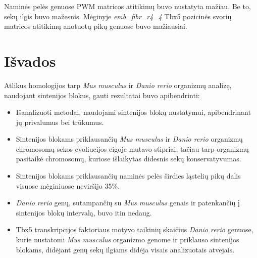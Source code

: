 \documentclass[12pt]{article}
\begin{document}
Naminės pelės genuose PWM matricos atitikimų buvo nustatyta mažiau. Be to, sekų
ilgis buvo mažesnis. Mėginyje \emph{emb\_fibr\_r4\_4} Tbx5 pozicinės svorių
matricos atitikimų anotuotų pikų genuose buvo mažiausiai.

\newpage


\section{Išvados}
Atlikus homologijos tarp \emph{Mus musculus} ir \emph{Danio rerio} organizmų
analizę, naudojant sintenijos blokus, gauti rezultatai buvo apibendrinti:

\begin{itemize}
    \item Išanalizuoti metodai, naudojami sintenijos blokų nustatymui,
          apibendrinant jų privalumus bei trūkumus.
    \item Sintenijos blokams priklausančių \emph{Mus musculus} ir
          \emph{Danio rerio} organizmų chromosomų sekos evoliucijos eigoje
          mutavo stipriai, tačiau tarp organizmų pasitaikė chromosomų, kuriose
          išlaikytas didesnis sekų konservatyvumas.
    \item Sintenijos blokams priklausančių naminės pelės širdies ląstelių pikų
          dalis visuose mėginiuose neviršijo 35\%.
    \item \emph{Danio rerio} genų, sutampančių su \emph{Mus musculus} genais ir
          patenkančių į sintenijos blokų intervalą, buvo itin nedaug.
    \item Tbx5 transkripcijos faktoriaus motyvo taikinių skaičius
          \emph{Danio rerio} genuose, kurie nustatomi \emph{Mus musculus}
          organizmo genome ir priklauso sintenijos blokams, didėjant genų sekų
          ilgiams didėja visais analizuotais atvejais.
\end{itemize}

\newpage

\end{document}
